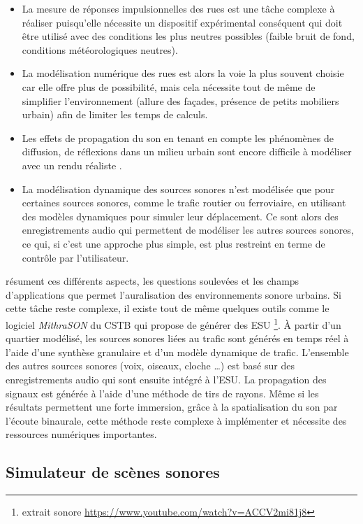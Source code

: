 \begin{itemize}
\item La mesure de réponses impulsionnelles des rues \cite{picaut2005experimental} est une tâche complexe à réaliser puisqu'elle nécessite un dispositif expérimental conséquent qui doit être utilisé avec des conditions les plus neutres possibles (faible bruit de fond, conditions météorologiques neutres).
\item La modélisation numérique des rues est alors la voie la plus souvent choisie car elle offre plus de possibilité, mais cela nécessite tout de même de simplifier l'environnement (allure des façades, présence de petits mobiliers urbain) afin de limiter les temps de calculs.
\item Les effets de propagation du son en tenant en compte les phénomènes de diffusion, de réflexions dans un milieu urbain sont encore difficile à modéliser avec un rendu réaliste \cite{schissler2014high}.
\item La modélisation dynamique des sources sonores n'est modélisée que pour certaines sources sonores, comme le trafic routier ou ferroviaire, en utilisant des modèles dynamiques pour simuler leur déplacement. Ce sont alors des enregistrements audio qui permettent de modéliser les autres sources sonores, ce qui, si c'est une approche plus simple, est plus restreint en terme de contrôle par l'utilisateur. 
\end{itemize}

\cite{stienen2015auralization} résument ces différents aspects, les questions soulevées et les champs d'applications que permet l'auralisation des environnements sonore urbains.
Si cette tâche reste complexe, il existe tout de même quelques outils comme le logiciel \textit{MithraSON} du CSTB qui propose de générer des ESU \footnote{extrait sonore \url{https://www.youtube.com/watch?v=ACCV2mi81j8}}. À partir d'un quartier modélisé, les sources sonores liées au trafic sont générés en temps réel  à l'aide d'une synthèse granulaire et d'un modèle dynamique de trafic. L'ensemble des autres sources sonores (voix, oiseaux, cloche \dots) est basé sur des enregistrements audio qui sont ensuite intégré à l'ESU. La propagation des signaux est générée à l'aide d'une méthode de tirs de rayons.
Même si les résultats permettent une forte immersion, grâce à la spatialisation du son par l'écoute binaurale, cette méthode reste complexe à implémenter et nécessite des ressources numériques importantes.

\subsection{Simulateur de scènes sonores}


